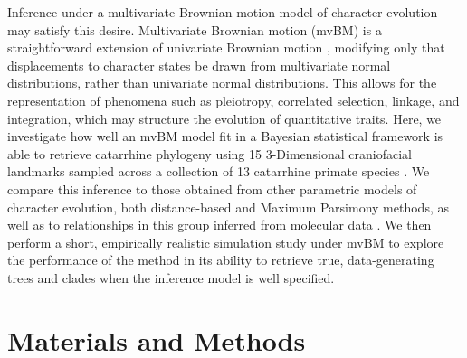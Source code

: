 \documentclass[10pt, twocolumn, twoside]{article}
\begin{document}
Inference under a multivariate Brownian motion model of character evolution may satisfy this desire. Multivariate Brownian motion (mvBM) is a straightforward extension of univariate Brownian motion \citep{felsensteinMaximumlikelihoodEstimationEvolutionary1973}, modifying only that displacements to character states be drawn from multivariate normal distributions, rather than univariate normal distributions. This allows for the representation of phenomena such as pleiotropy, correlated selection, linkage, and integration, which may structure the evolution of quantitative traits. Here, we investigate how well an mvBM model fit in a Bayesian statistical framework is able to retrieve catarrhine phylogeny using 15 3-Dimensional craniofacial landmarks sampled across a collection of 13 catarrhine primate species \citep{harvatiNeanderthalTaxonomyReconsidered2004}. We compare this inference to those obtained from other parametric models of character evolution, both distance-based and Maximum Parsimony methods, as well as to relationships in this group inferred from molecular data \citep{arnold10kTreesWebsiteNew2010}. We then perform a short, empirically realistic simulation study under mvBM to explore the performance of the method in its ability to retrieve true, data-generating trees and clades when the inference model is well specified. 

\section*{Materials and Methods}
\end{document}
